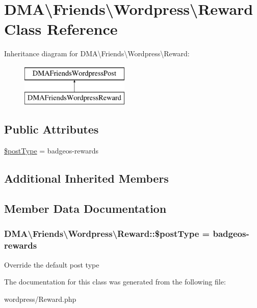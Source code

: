 \hypertarget{classDMA_1_1Friends_1_1Wordpress_1_1Reward}{}\section{D\+M\+A\textbackslash{}Friends\textbackslash{}Wordpress\textbackslash{}Reward Class Reference}
\label{classDMA_1_1Friends_1_1Wordpress_1_1Reward}
Inheritance diagram for D\+M\+A\textbackslash{}Friends\textbackslash{}Wordpress\textbackslash{}Reward\+:\begin{figure}[H]
\begin{center}
\leavevmode
\includegraphics[height=2.000000cm]{d6/d94/classDMA_1_1Friends_1_1Wordpress_1_1Reward}
\end{center}
\end{figure}
\subsection*{Public Attributes}
\begin{DoxyCompactItemize}
\item 
\hyperlink{classDMA_1_1Friends_1_1Wordpress_1_1Reward_a653920c3f524beabf1ab4350ae09df69}{\$post\+Type} = \textquotesingle{}badgeos-\/rewards\textquotesingle{}
\end{DoxyCompactItemize}
\subsection*{Additional Inherited Members}


\subsection{Member Data Documentation}
\hypertarget{classDMA_1_1Friends_1_1Wordpress_1_1Reward_a653920c3f524beabf1ab4350ae09df69}{}
\subsubsection[{\$post\+Type}]{\setlength{\rightskip}{0pt plus 5cm}D\+M\+A\textbackslash{}\+Friends\textbackslash{}\+Wordpress\textbackslash{}\+Reward\+::\$post\+Type = \textquotesingle{}badgeos-\/rewards\textquotesingle{}}\label{classDMA_1_1Friends_1_1Wordpress_1_1Reward_a653920c3f524beabf1ab4350ae09df69}
Override the default post type 

The documentation for this class was generated from the following file\+:\begin{DoxyCompactItemize}
\item 
wordpress/Reward.\+php\end{DoxyCompactItemize}
